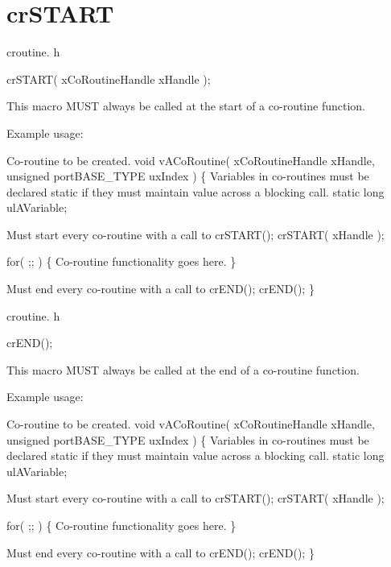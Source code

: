 \hypertarget{group__cr_s_t_a_r_t}{\section{cr\-S\-T\-A\-R\-T}
\label{group__cr_s_t_a_r_t}
}
croutine. h 
\begin{DoxyPre}
 crSTART( xCoRoutineHandle xHandle );\end{DoxyPre}


This macro M\-U\-S\-T always be called at the start of a co-\/routine function.

Example usage\-: 
\begin{DoxyPre}
Co-routine to be created.
 void vACoRoutine( xCoRoutineHandle xHandle, unsigned portBASE\_TYPE uxIndex )
 \{
Variables in co-routines must be declared static if they must maintain value across a blocking call.
 static long ulAVariable;\end{DoxyPre}



\begin{DoxyPre}Must start every co-routine with a call to crSTART();
     crSTART( xHandle );\end{DoxyPre}



\begin{DoxyPre}     for( ;; )
     \{
Co-routine functionality goes here.
     \}\end{DoxyPre}



\begin{DoxyPre}Must end every co-routine with a call to crEND();
     crEND();
 \}\end{DoxyPre}


croutine. h 
\begin{DoxyPre}
 crEND();\end{DoxyPre}


This macro M\-U\-S\-T always be called at the end of a co-\/routine function.

Example usage\-: 
\begin{DoxyPre}
Co-routine to be created.
 void vACoRoutine( xCoRoutineHandle xHandle, unsigned portBASE\_TYPE uxIndex )
 \{
Variables in co-routines must be declared static if they must maintain value across a blocking call.
 static long ulAVariable;\end{DoxyPre}



\begin{DoxyPre}Must start every co-routine with a call to crSTART();
     crSTART( xHandle );\end{DoxyPre}



\begin{DoxyPre}     for( ;; )
     \{
Co-routine functionality goes here.
     \}\end{DoxyPre}



\begin{DoxyPre}Must end every co-routine with a call to crEND();
     crEND();
 \}\end{DoxyPre}
 